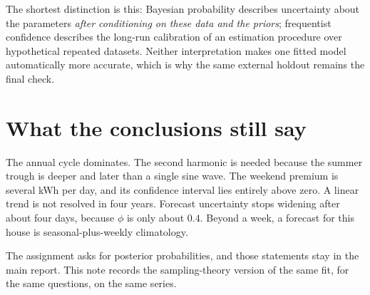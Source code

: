 \documentclass[11pt]{article}
\begin{document}
\noindent
The shortest distinction is this: Bayesian probability describes uncertainty
about the parameters \emph{after conditioning on these data and the priors};
frequentist confidence describes the long-run calibration of an estimation
procedure over hypothetical repeated datasets. Neither interpretation makes
one fitted model automatically more accurate, which is why the same external
holdout remains the final check.

\section{What the conclusions still say}

The annual cycle dominates. The second harmonic is needed because the summer
trough is deeper and later than a single sine wave. The weekend premium is
several kWh per day, and its confidence interval lies entirely above zero. A
linear trend is not resolved in four years. Forecast uncertainty stops
widening after about four days, because $\phi$ is only about $0.4$. Beyond a
week, a forecast for this house is seasonal-plus-weekly climatology.

The assignment asks for posterior probabilities, and those statements stay in
the main report. This note records the sampling-theory version of the same
fit, for the same questions, on the same series.
\end{document}
